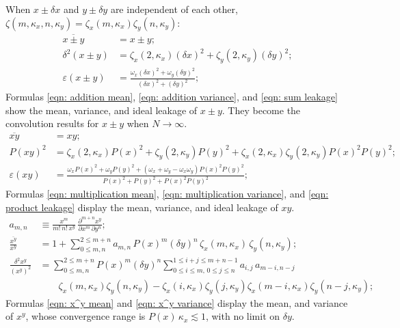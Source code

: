 \documentclass[twoside]{article}
\numberwithin{equation}{section}
\begin{document}
When $x \pm \delta x$ and $y \pm \delta y$ are independent of each other, $\zeta(m, \kappa_x, n, \kappa_y) = \zeta_{x}(m, \kappa_x) \zeta_{y}(n, \kappa_y)$:
\begin{align}
\label{eqn: addition mean}
\overline{x \pm y} &= x \pm y; \\
\label{eqn: addition variance}
\delta^2 (x \pm y) &= \zeta_x(2, \kappa_x) (\delta x)^2 + \zeta_y(2, \kappa_y) (\delta y)^2; \\
\label{eqn: sum leakage}
\varepsilon(x \pm y) &= \frac{\omega_x (\delta x)^2 + \omega_y (\delta y)^2}{(\delta x)^2 + (\delta y)^2};
\end{align}
Formulas \eqref{eqn: addition mean}, \eqref{eqn: addition variance}, and \eqref{eqn: sum leakage} show the mean, variance, and ideal leakage of $x \pm y$.
They become the convolution results for $x \pm y$ \cite{Probability_Statistics} when $N \rightarrow \infty$.
\begin{align}
\label{eqn: multiplication mean}
\overline{x y} &= xy; \\
\label{eqn: multiplication variance}
P(x y)^2 &= \zeta_x(2, \kappa_x) P(x)^2 + \zeta_y(2, \kappa_y) P(y)^2 + \zeta_x(2, \kappa_x) \zeta_y(2, \kappa_y) P(x)^2 P(y)^2; \\
\label{eqn: product leakage}
\varepsilon(x y) &= \frac{\omega_x P(x)^2 + \omega_y P(y)^2 +  (\omega_x + \omega_y - \omega_x \omega_y) P(x)^2 P(y)^2}{P(x)^2 + P(y)^2 + P(x)^2 P(y)^2}; 
\end{align}
Formulas \eqref{eqn: multiplication mean}, \eqref{eqn: multiplication variance}, and \eqref{eqn: product leakage} display the mean, variance, and ideal leakage of $x y$.
\begin{align}
a_{m,n} &\equiv \frac{x^m}{m!\,n!\,x^y}\,\frac{\partial^{m+n}x^y}{\partial x^m\,\partial y^n}; \\
\label{eqn: x^y mean}
\frac{\overline{x^y}}{x^y} &= 1 + \sum_{0 \le m,n}^{2 \le m+n} a_{m,n}\,P(x)^m(\delta y)^n\,\zeta_x(m,\kappa_x)\,\zeta_y(n,\kappa_y); \\
\label{eqn: x^y variance}
\frac{\delta^2 x^y}{(x^y)^2} &= \sum_{0 \le m,n}^{2 \le m+n} P(x)^m (\delta y)^n 
	\sum_{0 \le i \le m,\, 0 \le j \le n}^{1 \le i+j \le m+n-1} a_{i,j}\,a_{m-i,n-j} \\
	&\quad\quad \zeta_x(m, \kappa_x) \zeta_y(n, \kappa_y) - \zeta_x(i, \kappa_x) \zeta_y(j, \kappa_y) \zeta_x(m-i, \kappa_x) \zeta_y(n-j, \kappa_y); \nonumber
\end{align}
Formulas \eqref{eqn: x^y mean} and \eqref{eqn: x^y variance} display the mean, and variance of $x^y$, whose convergence range is $P(x)\,\kappa_x \lesssim 1$, with no limit on $\delta y$.
\end{document}
